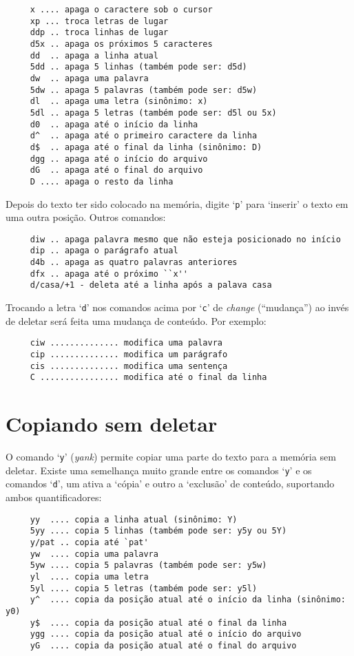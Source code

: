 \begin{verbatim}
     x .... apaga o caractere sob o cursor
     xp ... troca letras de lugar
     ddp .. troca linhas de lugar
     d5x .. apaga os próximos 5 caracteres
     dd  .. apaga a linha atual
     5dd .. apaga 5 linhas (também pode ser: d5d)
     dw  .. apaga uma palavra
     5dw .. apaga 5 palavras (também pode ser: d5w)
     dl  .. apaga uma letra (sinônimo: x)
     5dl .. apaga 5 letras (também pode ser: d5l ou 5x)
     d0  .. apaga até o início da linha
     d^  .. apaga até o primeiro caractere da linha
     d$  .. apaga até o final da linha (sinônimo: D)
     dgg .. apaga até o início do arquivo
     dG  .. apaga até o final do arquivo
     D .... apaga o resto da linha
\end{verbatim}

Depois do texto ter sido colocado na memória, digite `{\tt p}' para `inserir' o
texto em uma outra posição. Outros comandos:

\begin{verbatim}
     diw .. apaga palavra mesmo que não esteja posicionado no início
     dip .. apaga o parágrafo atual
     d4b .. apaga as quatro palavras anteriores
     dfx .. apaga até o próximo ``x''
     d/casa/+1 - deleta até a linha após a palava casa
\end{verbatim}

Trocando a letra `{\tt d}' nos comandos acima por `{\tt c}' de {\em change}
(``mudança'') ao invés de deletar será feita uma mudança de conteúdo.  Por
exemplo:

\begin{verbatim}
     ciw .............. modifica uma palavra
     cip .............. modifica um parágrafo
     cis .............. modifica uma sentença
     C ................ modifica até o final da linha
\end{verbatim}

\section{Copiando sem deletar}\label{Copiando sem deletar}

O comando `{\tt y}' ({\em yank}) permite copiar uma parte do texto para a
memória sem deletar.  Existe uma semelhança muito grande entre os comandos
`{\tt y}' e os comandos `{\tt d}', um ativa a `cópia' e outro a `exclusão' 
de conteúdo, suportando ambos quantificadores:

\begin{verbatim}
     yy  .... copia a linha atual (sinônimo: Y)
     5yy .... copia 5 linhas (também pode ser: y5y ou 5Y)
     y/pat .. copia até `pat'
     yw  .... copia uma palavra
     5yw .... copia 5 palavras (também pode ser: y5w)
     yl  .... copia uma letra
     5yl .... copia 5 letras (também pode ser: y5l)
     y^  .... copia da posição atual até o início da linha (sinônimo: y0)
     y$  .... copia da posição atual até o final da linha
     ygg .... copia da posição atual até o início do arquivo
     yG  .... copia da posição atual até o final do arquivo
\end{verbatim}

